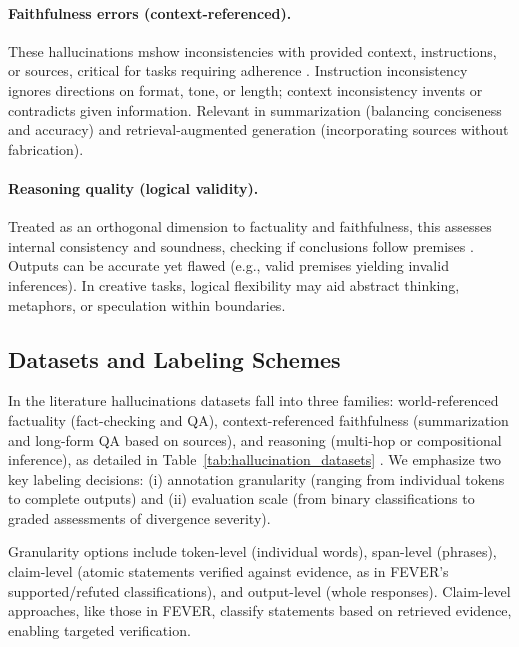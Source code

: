 \documentclass{llncs}
\begin{document}
\paragraph{Faithfulness errors (context-referenced).} These hallucinations mshow inconsistencies with provided context, instructions, or sources, critical for tasks requiring adherence \cite{huang2025survey}. Instruction inconsistency ignores directions on format, tone, or length; context inconsistency invents or contradicts given information. Relevant in summarization (balancing conciseness and accuracy) and retrieval-augmented generation (incorporating sources without fabrication).

\paragraph{Reasoning quality (logical validity).} Treated as an orthogonal dimension to factuality and faithfulness, this assesses internal consistency and soundness, checking if conclusions follow premises \cite{huang2025survey,jiang2024survey}. Outputs can be accurate yet flawed (e.g., valid premises yielding invalid inferences). In creative tasks, logical flexibility may aid abstract thinking, metaphors, or speculation within boundaries.

\subsection{Datasets and Labeling Schemes}

In the literature hallucinations datasets fall into three families: world-referenced factuality (fact-checking and QA), context-referenced faithfulness (summarization and long-form QA based on sources), and reasoning (multi-hop or compositional inference), as detailed in Table~\ref{tab:hallucination_datasets} \cite{ji2023hallucination,huang2025survey,jiang2024survey}. We emphasize two key labeling decisions: (i) annotation granularity (ranging from individual tokens to complete outputs) and (ii) evaluation scale (from binary classifications to graded assessments of divergence severity).

Granularity options include token-level (individual words), span-level (phrases), claim-level (atomic statements verified against evidence, as in FEVER's supported/refuted classifications), and output-level (whole responses). Claim-level approaches, like those in FEVER, classify statements based on retrieved evidence, enabling targeted verification.
\end{document}
